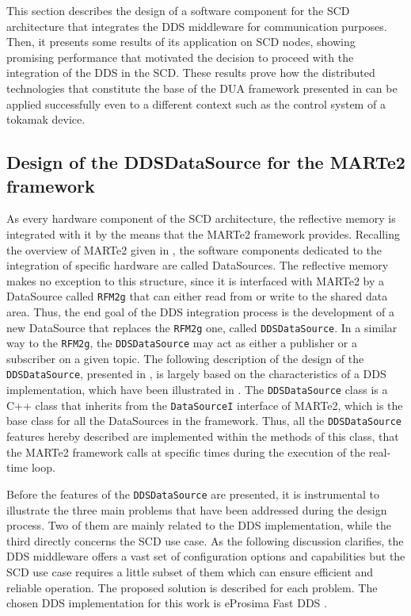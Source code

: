 This section describes the design of a software component for the SCD architecture that integrates the DDS middleware for communication purposes. Then, it presents some results of its application on SCD nodes, showing promising performance that motivated the decision to proceed with the integration of the DDS in the SCD. These results prove how the distributed technologies that constitute the base of the DUA framework presented in  can be applied successfully even to a different context such as the control system of a tokamak device.

\subsection{Design of the DDSDataSource for the MARTe2 framework}
\label{sec:ddsdatasource}
As every hardware component of the SCD architecture, the reflective memory is integrated with it by the means that the MARTe2 framework provides. Recalling the overview of MARTe2 given in , the software components dedicated to the integration of specific hardware are called DataSources. The reflective memory makes no exception to this structure, since it is interfaced with MARTe2 by a DataSource called \texttt{RFM2g} that can either read from or write to the shared data area. Thus, the end goal of the DDS integration process is the development of a new DataSource that replaces the \texttt{RFM2g} one, called \texttt{DDSDataSource}. In a similar way to the \texttt{RFM2g}, the \texttt{DDSDataSource} may act as either a publisher or a subscriber on a given topic. The following description of the design of the \texttt{DDSDataSource}, presented in \cite{masocco_distributed_2024}, is largely based on the characteristics of a DDS implementation, which have been illustrated in . The \texttt{DDSDataSource} class is a C++ class that inherits from the \texttt{DataSourceI} interface of MARTe2, which is the base class for all the DataSources in the framework. Thus, all the \texttt{DDSDataSource} features hereby described are implemented within the methods of this class, that the MARTe2 framework calls at specific times during the execution of the real-time loop.

Before the features of the \texttt{DDSDataSource} are presented, it is instrumental to illustrate the three main problems that have been addressed during the design process. Two of them are mainly related to the DDS implementation, while the third directly concerns the SCD use case. As the following discussion clarifies, the DDS middleware offers a vast set of configuration options and capabilities but the SCD use case requires a little subset of them which can ensure efficient and reliable operation. The proposed solution is described for each problem. The chosen DDS implementation for this work is eProsima Fast DDS \cite{eprosima_fast_nodate}.

